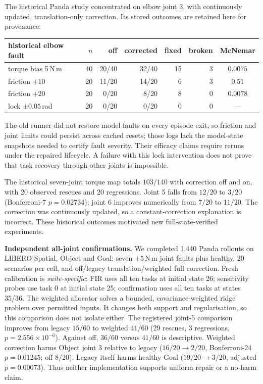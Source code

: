 \documentclass{article}
\begin{document}
The historical Panda study concentrated on elbow joint 3, with continuously updated,
translation-only correction. Its stored outcomes are retained here for provenance:
\begin{center}\small
\begin{tabular}{lrrrrrc}
\toprule
historical elbow fault & $n$ & off & corrected & fixed & broken & McNemar \\
\midrule
torque bias 5\,N\,m & 40 & 20/40 & 32/40 & 15 & 3 & $0.0075$ \\
friction $+10$ & 20 & 11/20 & 14/20 & 6 & 3 & $0.51$ \\
friction $+20$ & 20 & 0/20 & 8/20 & 8 & 0 & $0.0078$ \\
lock $\pm0.05$\,rad & 20 & 0/20 & 0/20 & 0 & 0 & --- \\
\bottomrule
\end{tabular}
\end{center}
The old runner did not restore model faults on every episode exit, so friction and joint
limits could persist across cached resets; those logs lack the model-state snapshots
needed to certify fault severity. Their efficacy claims require reruns under the repaired
lifecycle. A failure with this lock intervention does not prove that task recovery through
other joints is impossible.

The historical seven-joint torque map totals $103/140$ with correction off and on, with
20 observed rescues and 20 regressions. Joint 5 falls from $12/20$ to $3/20$
(Bonferroni-7 $p=0.02734$); joint 6 improves numerically from $7/20$ to $11/20$.
The correction was continuously updated, so a constant-correction explanation is incorrect.
These historical outcomes motivated new full-state-verified experiments.

\textbf{Independent all-joint confirmations.} We completed 1,440 Panda rollouts on
LIBERO Spatial, Object and Goal: seven $+5$\,N\,m joint faults plus healthy, 20 scenarios
per cell, and off/legacy translation/weighted full correction. Fresh calibration is
\emph{suite-specific}: FIR uses all ten tasks at initial state 26; sensitivity probes use
task 0 at initial state 25; confirmation uses all ten tasks at states 35/36. The weighted
allocator solves a bounded, covariance-weighted ridge problem over permitted inputs.
It changes both support and regularisation, so this comparison does not isolate either.
The registered joint-5 comparison improves from legacy $15/60$ to weighted $41/60$
(29 rescues, 3 regressions, $p=2.556\times10^{-6}$). Against off, $36/60$ versus $41/60$
is descriptive. Weighted correction harms Object joint 3 relative to legacy
($16/20\to2/20$, Bonferroni-24 $p=0.01245$; off $8/20$). Legacy itself harms healthy
Goal ($19/20\to3/20$, adjusted $p=0.00073$). Thus neither implementation supports
uniform repair or a no-harm claim.
\end{document}
